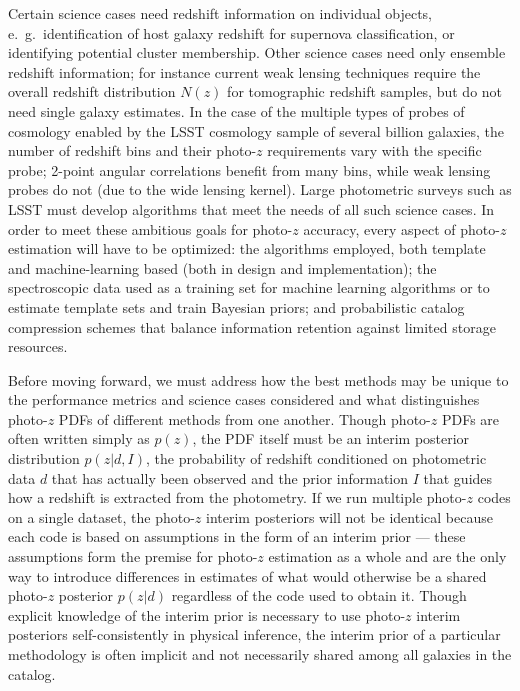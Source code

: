 \documentclass[usenatbib]{mn2e}
\begin{document}
Certain science cases need redshift information on individual objects, e.~g.~identification of host galaxy redshift for supernova classification, or identifying potential cluster membership.  
Other science cases need only ensemble redshift information; for instance current weak lensing techniques require the overall redshift distribution $N(z)$ for tomographic redshift samples, but do not need single galaxy estimates. 
In the case of the multiple types of probes of cosmology enabled by the
LSST cosmology sample of several billion galaxies, the number of redshift bins and their photo-$z$ requirements vary with the specific probe;  2-point angular correlations benefit from many bins, while weak lensing probes do not (due to the wide lensing kernel).
Large photometric surveys such as LSST must develop algorithms that meet the needs of all such science cases.  
In order to meet these ambitious goals for photo-$z$ accuracy, every aspect of photo-$z$ estimation will have to be optimized: the algorithms employed, both template and machine-learning based (both in design and implementation); the spectroscopic data used as a training set for machine learning algorithms or to estimate template sets and train Bayesian priors; and probabilistic catalog compression schemes that balance information retention against limited storage resources.

Before moving forward, we must address how the best methods may be unique to the performance metrics and science cases considered and what distinguishes photo-$z$ PDFs of different methods from one another.
Though photo-$z$ PDFs are often written simply as $p(z)$, the PDF itself must be an interim posterior distribution $p(z | d, I)$, the probability of redshift conditioned on photometric data $d$ that has actually been observed and the prior information $I$ that guides how a redshift is extracted from the photometry.
If we run multiple photo-$z$ codes on a single dataset, the photo-$z$ interim posteriors will not be identical because each code is based on assumptions in the form of an interim prior --- these assumptions form the premise for photo-$z$ estimation as a whole and are the only way to introduce differences in estimates of what would otherwise be a shared photo-$z$ posterior $p(z | d)$ regardless of the code used to obtain it.
Though explicit knowledge of the interim prior is necessary to use photo-$z$ interim posteriors self-consistently in physical inference, the interim prior of a particular methodology is often implicit and not necessarily shared among all galaxies in the catalog.
\end{document}
